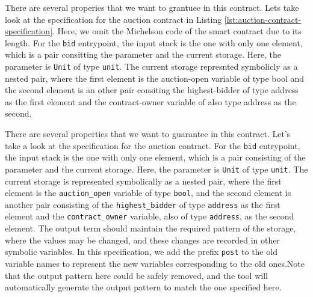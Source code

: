 \documentclass[a4paper,UKenglish,cleveref, autoref, thm-restate]{lipics-v2021}
\begin{document}
There are several properies that we want to grantuee in this contract. Lets take look at the specification for the auction contract in Listing \ref{lst:auction-contract-specification}. Here, we omit the Michelson code  of the smart contract due to its length. For the  \lstinline/bid/ entrypoint, the input stack is  the one with only one element, which is a pair consitting the parameter and the current storage. Here, the parameter is \lstinline/Unit/ of type \lstinline/unit/. The current storage represnted symbolicly as a nested pair, where the first element is the auction-open variable of type bool and the second element is an other pair consiting the highest-bidder of type address as the first element and the contract-owner variable of also type address as the second. 

There are several properties that we want to guarantee in this contract. Let's take a look at the specification for the auction contract. For the \lstinline/bid/ entrypoint, the input stack is the one with only one element, which is a pair consisting of the parameter and the current storage. Here, the parameter is \lstinline/Unit/ of type \lstinline/unit/. The current storage is represented symbolically as a nested pair, where the first element is the \lstinline/auction_open/ variable of type \lstinline/bool/, and the second element is another pair consisting of the \lstinline/highest_bidder/ of type \lstinline/address/ as the first element and the \lstinline/contract_owner/ variable, also of type \lstinline/address/, as the second element. The output term should maintain the required pattern of the storage, where the values may be changed, and these changes are recorded in other symbolic variables. In this specification, we add the prefix \lstinline/post/ to the old variable names to represent the new variables corresponding to the old ones.Note that the output pattern here could be safely removed, and the tool will automatically generate the output pattern to match the one specified here.
\end{document}
